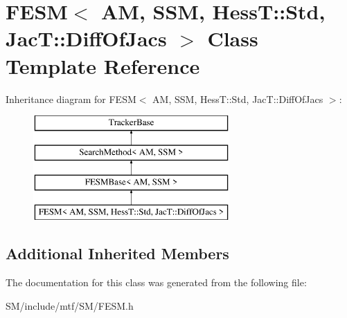 \hypertarget{classFESM_3_01AM_00_01SSM_00_01HessT_1_1Std_00_01JacT_1_1DiffOfJacs_01_4}{\section{F\-E\-S\-M$<$ A\-M, S\-S\-M, Hess\-T\-:\-:Std, Jac\-T\-:\-:Diff\-Of\-Jacs $>$ Class Template Reference}
\label{classFESM_3_01AM_00_01SSM_00_01HessT_1_1Std_00_01JacT_1_1DiffOfJacs_01_4}
}
Inheritance diagram for F\-E\-S\-M$<$ A\-M, S\-S\-M, Hess\-T\-:\-:Std, Jac\-T\-:\-:Diff\-Of\-Jacs $>$\-:\begin{figure}[H]
\begin{center}
\leavevmode
\includegraphics[height=4.000000cm]{classFESM_3_01AM_00_01SSM_00_01HessT_1_1Std_00_01JacT_1_1DiffOfJacs_01_4}
\end{center}
\end{figure}
\subsection*{Additional Inherited Members}


The documentation for this class was generated from the following file\-:\begin{DoxyCompactItemize}
\item 
S\-M/include/mtf/\-S\-M/F\-E\-S\-M.\-h\end{DoxyCompactItemize}
